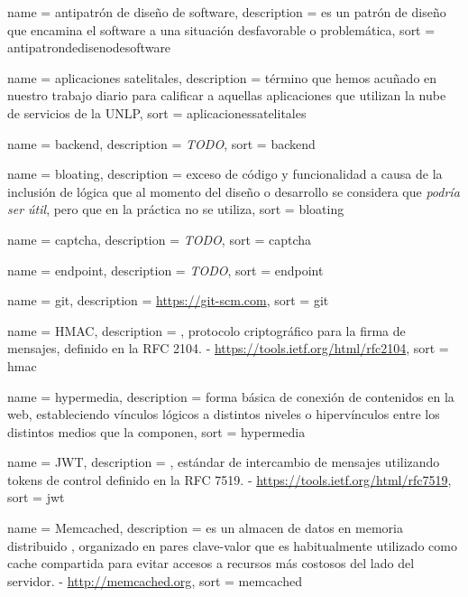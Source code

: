  {
  name = {antipatrón de diseño de software},
  description = {es un patrón de diseño que encamina el software a una situación desfavorable o problemática},
  sort = {antipatrondedisenodesoftware}
}

 {
  name = {aplicaciones satelitales},
  description = {término que hemos acuñado en nuestro trabajo diario para calificar a aquellas aplicaciones que utilizan la nube de servicios de la UNLP},
  sort = {aplicacionessatelitales}
}

 {
  name = {backend},
  description = {\textit{TODO}},
  sort = {backend}
}

 {
  name = {bloating},
  description = {exceso de código y funcionalidad a causa de la inclusión de lógica que al momento del diseño o desarrollo se considera que \textit{podría ser útil}, pero que en la práctica no se utiliza},
  sort = {bloating}
}

 {
  name = {captcha},
  description = {\textit{TODO}},
  sort = {captcha}
}

 {
  name = {endpoint},
  description = {\textit{TODO}},
  sort = {endpoint}
}

 {
  name = {git},
  description = {\url{https://git-scm.com}},
  sort = {git}
}

 {
  name = {HMAC},
  description = {, protocolo criptográfico para la firma de mensajes, definido en la RFC 2104. - \url{https://tools.ietf.org/html/rfc2104}},
  sort = {hmac}
}

 {
  name = {hypermedia},
  description = {forma básica de conexión de contenidos en la web, estableciendo vínculos lógicos a distintos niveles o hipervínculos entre los distintos medios que la componen},
  sort = {hypermedia}
}

 {
  name = {JWT},
  description = {, estándar de intercambio de mensajes utilizando tokens de control definido en la RFC 7519. - \url{https://tools.ietf.org/html/rfc7519}},
  sort = {jwt}
}

 {
  name = {Memcached},
  description = {es un almacen de datos en memoria distribuido , organizado en pares clave-valor que es habitualmente utilizado como cache compartida para evitar accesos a recursos más costosos del lado del servidor. - \url{http://memcached.org}},
  sort = {memcached}
}

